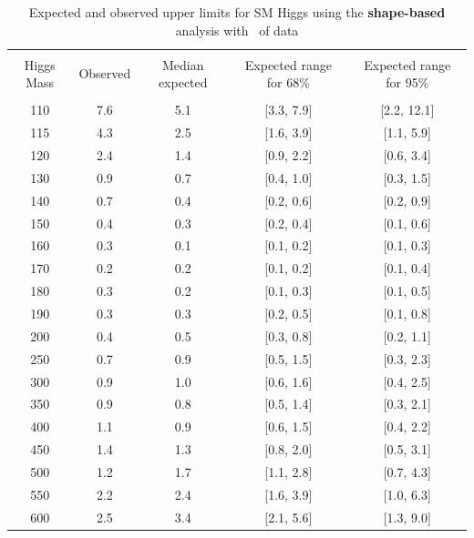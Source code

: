\begin{table}[!hbp]
\begin{center}
\begin{tabular}{c c c c c}
\hline
\vspace{-3mm} && \\
 Higgs Mass   & Observed & Median expected & Expected range for 68\% & Expected range for 95\%   \\
\vspace{-3mm} && \\
\hline
110 & 7.6 & 5.1 & [3.3, 7.9] & [2.2, 12.1] \\
115 & 4.3 & 2.5 & [1.6, 3.9] & [1.1, 5.9] \\
120 & 2.4 & 1.4 & [0.9, 2.2] & [0.6, 3.4] \\
130 & 0.9 & 0.7 & [0.4, 1.0] & [0.3, 1.5] \\
140 & 0.7 & 0.4 & [0.2, 0.6] & [0.2, 0.9] \\
150 & 0.4 & 0.3 & [0.2, 0.4] & [0.1, 0.6] \\
160 & 0.3 & 0.1 & [0.1, 0.2] & [0.1, 0.3] \\
170 & 0.2 & 0.2 & [0.1, 0.2] & [0.1, 0.4] \\
180 & 0.3 & 0.2 & [0.1, 0.3] & [0.1, 0.5] \\
190 & 0.3 & 0.3 & [0.2, 0.5] & [0.1, 0.8] \\
200 & 0.4 & 0.5 & [0.3, 0.8] & [0.2, 1.1] \\
250 & 0.7 & 0.9 & [0.5, 1.5] & [0.3, 2.3] \\
300 & 0.9 & 1.0 & [0.6, 1.6] & [0.4, 2.5] \\
350 & 0.9 & 0.8 & [0.5, 1.4] & [0.3, 2.1] \\
400 & 1.1 & 0.9 & [0.6, 1.5] & [0.4, 2.2] \\
450 & 1.4 & 1.3 & [0.8, 2.0] & [0.5, 3.1] \\
500 & 1.2 & 1.7 & [1.1, 2.8] & [0.7, 4.3] \\
550 & 2.2 & 2.4 & [1.6, 3.9] & [1.0, 6.3] \\
600 & 2.5 & 3.4 & [2.1, 5.6] & [1.3, 9.0] \\
\hline
\end{tabular}
\caption{Expected and observed upper limits for SM Higgs using the
  {\bf shape-based} analysis with \intlumi\ of data}
\label{tab:mvabase_uls}
\end{center}
\end{table}

